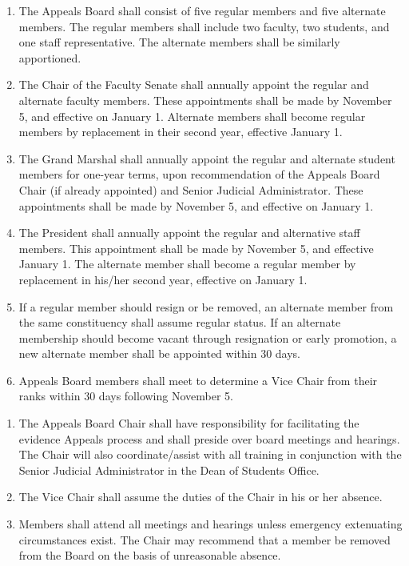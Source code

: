 
\begin{enumerate}
    \item The Appeals Board shall consist of five regular members and five alternate members. The regular members shall include two faculty, two students, and one staff representative. The alternate members shall be similarly apportioned.
    \item The Chair of the Faculty Senate shall annually appoint the regular and alternate faculty members. These appointments shall be made by November 5, and effective on January 1. Alternate members shall become regular members by replacement in their second year, effective January 1.
    \item The Grand Marshal shall annually appoint the regular and alternate student members for one-year terms, upon recommendation of the Appeals Board Chair (if already appointed) and Senior Judicial Administrator. These appointments shall be made by November 5, and effective on January 1.
    \item The President shall annually appoint the regular and alternative staff members. This appointment shall be made by November 5, and effective January 1. The alternate member shall become a regular member by replacement in his/her second year, effective on January 1.
    \item If a regular member should resign or be removed, an alternate member from the same constituency shall assume regular status. If an alternate membership should become vacant through resignation or early promotion, a new alternate member shall be appointed within 30 days.
    \item Appeals Board members shall meet to determine a Vice Chair from their ranks within 30 days following November 5.
\end{enumerate}

\begin{enumerate}
    \item The Appeals Board Chair shall have responsibility for facilitating the evidence Appeals process and shall preside over board meetings and hearings. The Chair will also coordinate/assist with all training in conjunction with the Senior Judicial Administrator in the Dean of Students Office.
    \item The Vice Chair shall assume the duties of the Chair in his or her absence.
    \item Members shall attend all meetings and hearings unless emergency extenuating circumstances exist. The Chair may recommend that a member be removed from the Board on the basis of unreasonable absence.
\end{enumerate}

